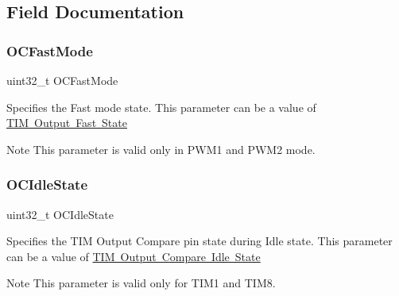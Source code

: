 \subsection{Field Documentation}
\mbox{\label{struct_t_i_m___o_c___init_type_def_aadc3d763f52920adcd0150ffbad1043a}} 
\subsubsection{\texorpdfstring{O\+C\+Fast\+Mode}{OCFastMode}}
{\footnotesize\ttfamily uint32\+\_\+t O\+C\+Fast\+Mode}

Specifies the Fast mode state. This parameter can be a value of \mbox{\hyperlink{group___t_i_m___output___fast___state}{T\+IM Output Fast State}} \begin{DoxyNote}{Note}
This parameter is valid only in P\+W\+M1 and P\+W\+M2 mode. 
\end{DoxyNote}
\mbox{\label{struct_t_i_m___o_c___init_type_def_a57bb589da3cf2b39b727fe4a3d334ab3}} 
\subsubsection{\texorpdfstring{O\+C\+Idle\+State}{OCIdleState}}
{\footnotesize\ttfamily uint32\+\_\+t O\+C\+Idle\+State}

Specifies the T\+IM Output Compare pin state during Idle state. This parameter can be a value of \mbox{\hyperlink{group___t_i_m___output___compare___idle___state}{T\+IM Output Compare Idle State}} \begin{DoxyNote}{Note}
This parameter is valid only for T\+I\+M1 and T\+I\+M8. 
\end{DoxyNote}
\mbox{\label{struct_t_i_m___o_c___init_type_def_add4ac9143086c89effbede5c54e958bf}} 
